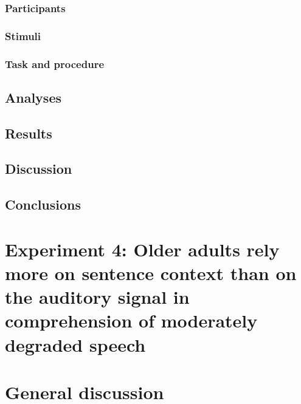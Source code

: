 \documentclass[a4paper, nobind]{templates/ociamthesis}
\begin{document}
\hypertarget{participants-2}{%
\subsection{Participants}\label{participants-2}}

\hypertarget{stimuli-1}{%
\subsection{Stimuli}\label{stimuli-1}}

\hypertarget{task-and-procedure}{%
\subsection{Task and procedure}\label{task-and-procedure}}

\hypertarget{analyses-3}{%
\section{Analyses}\label{analyses-3}}

\hypertarget{results-1}{%
\section{Results}\label{results-1}}

\hypertarget{discussion-1}{%
\section{Discussion}\label{discussion-1}}

\hypertarget{conclusions-1}{%
\section{Conclusions}\label{conclusions-1}}

\hypertarget{experiment-4-older-adults-rely-more-on-sentence-context-than-on-the-auditory-signal-in-comprehension-of-moderately-degraded-speech}{%
\chapter{Experiment 4: Older adults rely more on sentence context than on the auditory signal in comprehension of moderately degraded speech}\label{experiment-4-older-adults-rely-more-on-sentence-context-than-on-the-auditory-signal-in-comprehension-of-moderately-degraded-speech}}

\minitoc

\hypertarget{general-discussion-1}{%
\chapter{General discussion}\label{general-discussion-1}}
\end{document}
